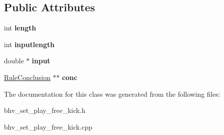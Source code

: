 \subsection*{Public Attributes}
\begin{DoxyCompactItemize}
\item 
\hypertarget{classOutputMembershipFunction_abd96d5b1ad86eff3ad01ee48cff8cb71}{
int {\bfseries length}}
\label{classOutputMembershipFunction_abd96d5b1ad86eff3ad01ee48cff8cb71}

\item 
\hypertarget{classOutputMembershipFunction_a70682e2b66635ab4c8b232e55e9f1266}{
int {\bfseries inputlength}}
\label{classOutputMembershipFunction_a70682e2b66635ab4c8b232e55e9f1266}

\item 
\hypertarget{classOutputMembershipFunction_a335c9b6f453b331cc1571e909ad490b4}{
double $\ast$ {\bfseries input}}
\label{classOutputMembershipFunction_a335c9b6f453b331cc1571e909ad490b4}

\item 
\hypertarget{classOutputMembershipFunction_ade6cbf0d6672da7bc60692304f9c16a7}{
\hyperlink{classRuleConclusion}{RuleConclusion} $\ast$$\ast$ {\bfseries conc}}
\label{classOutputMembershipFunction_ade6cbf0d6672da7bc60692304f9c16a7}

\end{DoxyCompactItemize}


The documentation for this class was generated from the following files:\begin{DoxyCompactItemize}
\item 
bhv\_\-set\_\-play\_\-free\_\-kick.h\item 
bhv\_\-set\_\-play\_\-free\_\-kick.cpp\end{DoxyCompactItemize}
